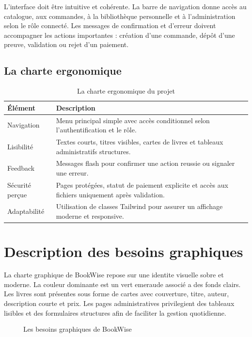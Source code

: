 \documentclass[12pt,a4paper]{report}
\begin{document}
L'interface doit être intuitive et cohérente. La barre de navigation donne accès au catalogue, aux commandes, à la bibliothèque personnelle et à l'administration selon le rôle connecté. Les messages de confirmation et d'erreur doivent accompagner les actions importantes : création d'une commande, dépôt d'une preuve, validation ou rejet d'un paiement.

\subsection{La charte ergonomique}

\begin{longtable}{|p{4cm}|p{9.6cm}|}
    \caption{La charte ergonomique du projet}\\
    \hline
    \textbf{Élément} & \textbf{Description}\\
    \hline
    Navigation & Menu principal simple avec accès conditionnel selon l'authentification et le rôle.\\
    \hline
    Lisibilité & Textes courts, titres visibles, cartes de livres et tableaux administratifs structures.\\
    \hline
    Feedback & Messages flash pour confirmer une action reussie ou signaler une erreur.\\
    \hline
    Sécurité perçue & Pages protégées, statut de paiement explicite et accès aux fichiers uniquement après validation.\\
    \hline
    Adaptabilité & Utilisation de classes Tailwind pour assurer un affichage moderne et responsive.\\
    \hline
\end{longtable}

\section{Description des besoins graphiques}

La charte graphique de BookWise repose sur une identite visuelle sobre et moderne. La couleur dominante est un vert emeraude associé a des fonds clairs. Les livres sont présentes sous forme de cartes avec couverture, titre, auteur, description courte et prix. Les pages administratives privilegient des tableaux lisibles et des formulaires structures afin de faciliter la gestion quotidienne.

\begin{figure}[htbp]
    \centering
    \caption{Les besoins graphiques de BookWise}
\end{figure}
\end{document}
